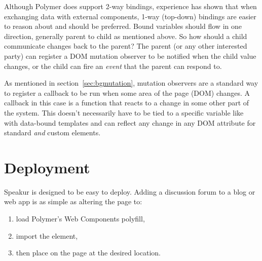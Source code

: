 Although Polymer does support 2-way bindings, 
experience has shown that when exchanging data with external components, 1-way (top-down) bindings are easier to reason about and should be preferred.
Bound variables should flow in one direction, generally parent to child as mentioned above.
So how should a child communicate changes back to the parent? 
The parent (or any other interested party) can register a DOM mutation observer to be notified when the child value changes, or the child can fire an \textit{event} that the parent can respond to.

As mentioned in section~\ref{sec:bgmutation}, 
mutation observers are a standard way to register a callback to be run when some area of the page (DOM) changes. 
A callback in this case is a function that reacts to a change in some other part of the system.
This doesn't necessarily have to be tied to a specific variable like with data-bound templates and can reflect any change in any DOM attribute for standard \textit{and} custom elements. 

\section{Deployment}
Speakur is designed to be easy to deploy.
Adding a discussion forum to a blog or web app is as simple as altering the page to:

\begin{enumerate}
\item load Polymer's Web Components polyfill,
\item import the  element,
\item then place  on the page at the desired location. 
\end{enumerate}

